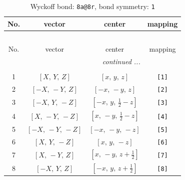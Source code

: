 \documentclass[fleqn,8pt]{jsarticle}
\begin{document}
\begin{longtable}{cccc}
\caption{Wyckoff bond: {\tt 8a@8r}, bond symmetry: {\tt 1}}
 \\
 \hline \hline
No. & vector & center & mapping \\ \hline \endfirsthead

\multicolumn{3}{l}{\tablename\ \thetable{}} \\
 \hline \hline
No. & vector & center & mapping \\ \hline \endhead

 \hline \hline
\multicolumn{3}{r}{\footnotesize\it continued ...} \\ \endfoot

 \hline \hline
\multicolumn{3}{r}{} \\ \endlastfoot

1 & $\left[ X,\, Y,\, Z \right]$ & $\left[ x,\, y,\, z \right]$ & {\tt [1]} \\ \hline
2 & $\left[ - X,\, - Y,\, Z \right]$ & $\left[ - x,\, - y,\, z \right]$ & {\tt [2]} \\ \hline
3 & $\left[ - X,\, Y,\, - Z \right]$ & $\left[ - x,\, y,\, \frac{1}{2} - z \right]$ & {\tt [3]} \\ \hline
4 & $\left[ X,\, - Y,\, - Z \right]$ & $\left[ x,\, - y,\, \frac{1}{2} - z \right]$ & {\tt [4]} \\ \hline
5 & $\left[ - X,\, - Y,\, - Z \right]$ & $\left[ - x,\, - y,\, - z \right]$ & {\tt [5]} \\ \hline
6 & $\left[ X,\, Y,\, - Z \right]$ & $\left[ x,\, y,\, - z \right]$ & {\tt [6]} \\ \hline
7 & $\left[ X,\, - Y,\, Z \right]$ & $\left[ x,\, - y,\, z + \frac{1}{2} \right]$ & {\tt [7]} \\ \hline
8 & $\left[ - X,\, Y,\, Z \right]$ & $\left[ - x,\, y,\, z + \frac{1}{2} \right]$ & {\tt [8]} \\
\end{longtable}
\end{document}
